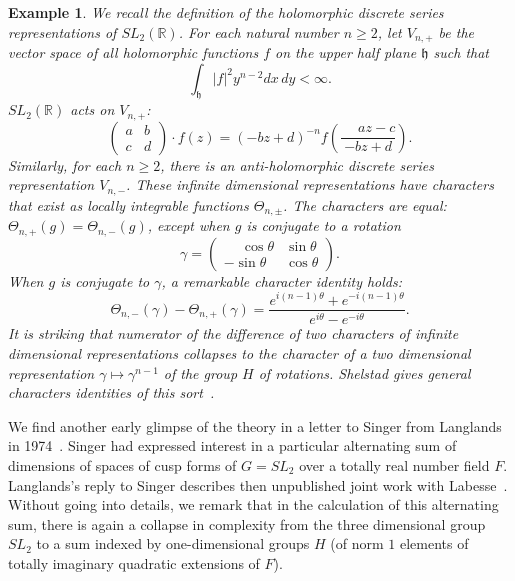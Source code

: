 \documentclass[brochure,english,12pt]{bourbaki}
\theoremstyle{plain}
\newtheorem{example}[equation]{Example}
\newcommand{\ring}[1]{\mathbb{#1}}
\begin{document}
\begin{example}\label{ex:sl2}  We recall the definition of the holomorphic discrete series representations
  of $SL_2(\ring{R})$.  For each natural number $n\ge 2$, let
  $V_{n,+}$ be the vector space of all holomorphic functions $f$ on
  the upper half plane ${\mathfrak h}$ such that
\[
\int_{\mathfrak h} |f|^2 y^{n-2} dx\, dy < \infty.
\]
$SL_2(\ring{R})$ acts on $V_{n,+}$:
\[
\begin{pmatrix} a & b \\ c & d \end{pmatrix} \cdot f(z) = 
(-b z + d ) ^{-n} f (\frac{\phantom{-}a z - c}{-b z + d}).
\]
Similarly, for each $n\ge 2$,  there is an anti-holomorphic discrete series
representation  $V_{n,-}$.  These infinite
dimensional representations have characters that exist as locally integrable
functions $\Theta_{n,\pm}$.  The characters are equal:
$\Theta_{n,+}(g)=\Theta_{n,-}(g)$, except when $g$ is conjugate to a
rotation
\[
\gamma = 
\begin{pmatrix} \phantom{-}\cos\theta & \sin\theta \\ -\sin\theta & \cos\theta\end{pmatrix}.
\] 
When $g$ is conjugate to $\gamma$, a remarkable character identity holds:
\begin{equation}\label{eqn:discrete-series}
\Theta_{n,-}(\gamma) - \Theta_{n,+}(\gamma) = 
\frac{e^{i (n-1) \theta} + e^{- i (n-1) \theta}}{e^{i\theta}-e^{-i\theta}}.
\end{equation}
It is striking that numerator of the difference of two characters of
infinite dimensional representations collapses to the character of a two
dimensional representation $\gamma\mapsto \gamma^{n-1}$ of the group $H$ of
rotations.  Shelstad gives general characters identities of this
sort~\cite{Shelstad:OI}. %
\end{example}

We find another early glimpse of the theory in a letter to Singer from
Langlands in 1974~\cite{L:singer:1974}.  Singer had expressed interest
in a particular alternating sum of dimensions of spaces of cusp forms
of $G=SL_2$ over a totally real number field $F$.  Langlands's reply
to Singer describes then unpublished joint work with
Labesse~\cite{LL:1979}.  Without going into details, we remark that in
the calculation of  this alternating sum, there is again a collapse in
complexity from the three dimensional group $SL_2$ to a sum indexed by
one-dimensional groups $H$ (of norm $1$ elements of totally imaginary
quadratic extensions of $F$).
\end{document}
